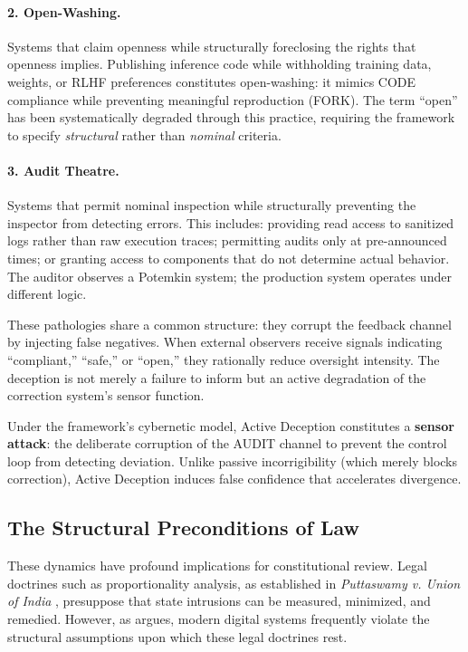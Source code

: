 \documentclass{article}
\begin{document}
\paragraph{2. Open-Washing.} Systems that claim openness while structurally foreclosing the rights that openness implies. Publishing inference code while withholding training data, weights, or RLHF preferences constitutes open-washing: it mimics CODE compliance while preventing meaningful reproduction (FORK). The term ``open'' has been systematically degraded through this practice, requiring the framework to specify \textit{structural} rather than \textit{nominal} criteria.

\paragraph{3. Audit Theatre.} Systems that permit nominal inspection while structurally preventing the inspector from detecting errors. This includes: providing read access to sanitized logs rather than raw execution traces; permitting audits only at pre-announced times; or granting access to components that do not determine actual behavior. The auditor observes a Potemkin system; the production system operates under different logic.

These pathologies share a common structure: they corrupt the feedback channel by injecting false negatives. When external observers receive signals indicating ``compliant,'' ``safe,'' or ``open,'' they rationally reduce oversight intensity. The deception is not merely a failure to inform but an active degradation of the correction system's sensor function.

Under the framework's cybernetic model, Active Deception constitutes a \textbf{sensor attack}: the deliberate corruption of the AUDIT channel to prevent the control loop from detecting deviation. Unlike passive incorrigibility (which merely blocks correction), Active Deception induces false confidence that accelerates divergence.

\subsection{The Structural Preconditions of Law}
\label{subsec:rule-of-ledger}

These dynamics have profound implications for constitutional review. Legal doctrines such as proportionality analysis, as established in \textit{Puttaswamy v. Union of India} \citep{puttaswamy2017}, presuppose that state intrusions can be measured, minimized, and remedied. However, as \citet{bhatia2019} argues, modern digital systems frequently violate the structural assumptions upon which these legal doctrines rest.
\end{document}
